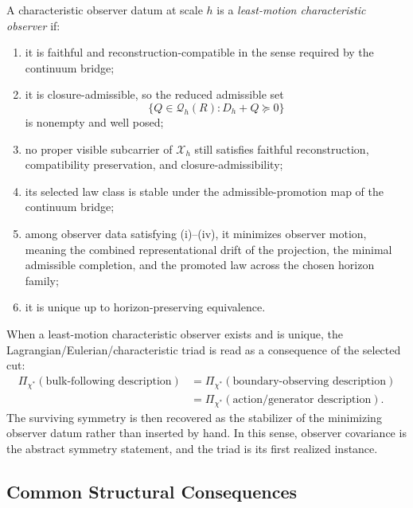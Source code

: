 \begin{definition}
\label{def:least-motion-characteristic-observer}
A characteristic observer datum at scale \(h\) is a
\emph{least-motion characteristic observer} if:
\begin{enumerate}[label=(\roman*), leftmargin=2em, itemsep=0.2em]
\item it is faithful and reconstruction-compatible in the sense required by
      the continuum bridge;
\item it is closure-admissible, so the reduced admissible set
      \[
      \{Q\in\mathcal Q_h(R): D_h+Q\succeq 0\}
      \]
      is nonempty and well posed;
\item no proper visible subcarrier of \(\mathcal X_h\) still satisfies
      faithful reconstruction, compatibility preservation, and
      closure-admissibility;
\item its selected law class is stable under the admissible-promotion map of
      the continuum bridge;
\item among observer data satisfying (i)--(iv), it minimizes observer motion,
      meaning the combined representational drift of the projection, the
      minimal admissible completion, and the promoted law across the chosen
      horizon family;
\item it is unique up to horizon-preserving equivalence.
\end{enumerate}
\end{definition}

\begin{remark}
\label{rem:triad-consequence-observer-selection}
When a least-motion characteristic observer exists and is unique, the
Lagrangian/Eulerian/characteristic triad is read as a consequence of the
selected cut:
\[
\begin{aligned}
\Pi_{\chi^\ast}(\text{bulk-following description})
&=
\Pi_{\chi^\ast}(\text{boundary-observing description})\\
&=
\Pi_{\chi^\ast}(\text{action/generator description}).
\end{aligned}
\]
The surviving symmetry is then recovered as the stabilizer of the minimizing
observer datum rather than inserted by hand. In this sense, observer
covariance is the abstract symmetry statement, and the triad is its first
realized instance.
\end{remark}

\subsection{Common Structural Consequences}


